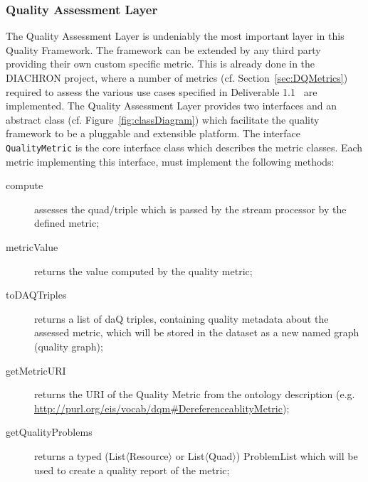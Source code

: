 \subsubsection{Quality Assessment Layer}
\label{sec:qaLayer}
The Quality Assessment Layer is undeniably the most important layer in this Quality Framework.
The framework can be extended by any third party providing their own custom specific metric.
This is already done in the DIACHRON project, where a number of metrics (cf. Section~\ref{sec:DQMetrics}) required to assess the various use cases specified in Deliverable 1.1~\cite{diachron-d1.1} are implemented.
The Quality Assessment Layer provides two interfaces and an abstract class (cf. Figure~\ref{fig:classDiagram}) which facilitate the quality framework to be a pluggable and extensible platform.
The interface \texttt{QualityMetric} is the core interface class which describes the metric classes.
Each metric implementing this interface, must implement the following methods:
\begin{description}
\item[compute] assesses the quad/triple which is passed by the stream processor by the defined metric;
\item[metricValue] returns the value computed by the quality metric;
\item[toDAQTriples] returns a list of daQ triples, containing quality metadata about the assessed metric, which will be stored in the dataset as a new named graph (quality graph);
\item[getMetricURI] returns the URI of the Quality Metric from the ontology description (e.g. \url{http://purl.org/eis/vocab/dqm#DereferenceablityMetric});
\item[getQualityProblems] returns a typed (List$\langle$Resource$\rangle$ or List$\langle$Quad$\rangle$) ProblemList which will be used to create a quality report of the metric;
\end{description}

